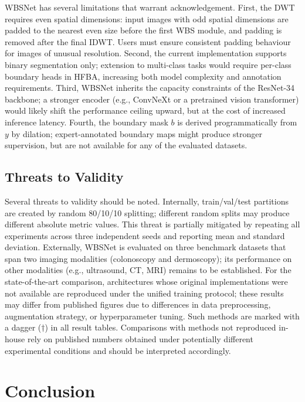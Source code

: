 \documentclass[journal]{IEEEtran}
\begin{document}
WBSNet has several limitations that warrant acknowledgement.
First, the DWT requires even spatial dimensions: input images with odd
spatial dimensions are padded to the nearest even size before the first WBS
module, and padding is removed after the final IDWT.
Users must ensure consistent padding behaviour for images of unusual
resolution.
Second, the current implementation supports binary segmentation only;
extension to multi-class tasks would require per-class boundary heads in
HFBA, increasing both model complexity and annotation requirements.
Third, WBSNet inherits the capacity constraints of the ResNet-34 backbone;
a stronger encoder (e.g., ConvNeXt or a pretrained vision transformer) would
likely shift the performance ceiling upward, but at the cost of increased
inference latency.
Fourth, the boundary mask $b$ is derived programmatically from $y$ by
dilation; expert-annotated boundary maps might produce stronger supervision,
but are not available for any of the evaluated datasets.

\subsection{Threats to Validity}

Several threats to validity should be noted.
Internally, train/val/test partitions are created by random 80/10/10 splitting;
different random splits may produce different absolute metric values.
This threat is partially mitigated by repeating all experiments across three
independent seeds and reporting mean and standard deviation.
Externally, WBSNet is evaluated on three benchmark datasets that span two
imaging modalities (colonoscopy and dermoscopy); its performance on other
modalities (e.g., ultrasound, CT, MRI) remains to be established.
For the state-of-the-art comparison, architectures whose original
implementations were not available are reproduced under the unified training
protocol; these results may differ from published figures due to differences
in data preprocessing, augmentation strategy, or hyperparameter tuning.
Such methods are marked with a dagger ($\dagger$) in all result tables.
Comparisons with methods not reproduced in-house rely on published numbers
obtained under potentially different experimental conditions and should be
interpreted accordingly.


\section{Conclusion}\label{sec:conclusion}
\end{document}
